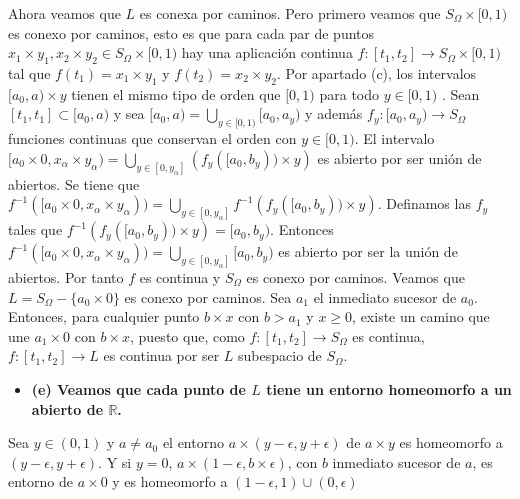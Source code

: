 \documentclass{article}
\begin{document}
Ahora veamos que $L$ es conexa por caminos. Pero primero veamos que $S_\Omega\times [0,1)$ es conexo por caminos, esto es que para cada par de puntos $x_1\times y_1,x_2\times y_2\in S_\Omega\times [0,1)$ hay una aplicación continua $f:[t_1,t_2]\rightarrow S_\Omega\times [0,1)$ tal que $f(t_1)=x_1\times y_1$ y $f(t_2)=x_2\times y_2$.  Por apartado (c), los intervalos $[a_0,a)\times {y}$ tienen el mismo tipo de orden que $[0,1)$ para todo $y\in [0,1)$ . Sean $[t_1,t_1]\subset [a_0,a)$ y sea $[a_0,a)=\bigcup_{y\in [0,1)}[a_0,a_y)$ y además $f_y:[a_0,a_y)\rightarrow S_\Omega$ funciones continuas que conservan el orden con $y\in [0,1)$. El intervalo $[a_0\times 0,x_\alpha\times y_\alpha)=\bigcup_{y\in [0,y_\alpha]}
\left( f_y([a_0,b_y))\times y\right)$ es abierto por ser unión de abiertos. Se tiene que $f^{-1}([a_0\times 0,x_\alpha\times y_\alpha))= \bigcup_{y\in [0,y_\alpha]}
f^{-1}\left( f_y([a_0,b_y))\times y\right)$. Definamos las $f_y$ tales que $f^{-1}\left(f_y([a_0,b_y))\times y\right)= [a_0,b_y)$. Entonces 
$f^{-1}([a_0\times 0,x_\alpha\times y_\alpha))=\bigcup_{y\in [0,y_\alpha]}
[a_0,b_y)$ es abierto por ser la unión de abiertos. Por tanto $f$ es continua y $S_\Omega$ es conexo por caminos. Veamos que $L=S_\Omega-\{a_0\times 0\}$ es conexo por caminos. Sea $a_1$ el inmediato sucesor de $a_0$. Entonces, para cualquier punto $b\times x$ con $b>a_1$ y $x\geq 0$, existe un camino que une $a_1\times 0$ con $b\times x$, puesto que, como $f:[t_1,t_2]\rightarrow S_\Omega$ es continua, $f:[t_1,t_2]\rightarrow L$ es continua por ser $L$ subespacio de $S_\Omega$.
\begin{itemize}
\item \bf (e) \rm Veamos que cada punto de $L$ tiene un entorno homeomorfo a un abierto de $\mathbb{R}$.
\end{itemize}
Sea $y\in (0,1)$ y $a\neq a_0$ el entorno $a\times (y-\epsilon,y+\epsilon)$ de $a\times y$ es homeomorfo a $(y-\epsilon,y+\epsilon)$. Y si $y=0$, $a\times (1-\epsilon,b \times \epsilon)$, con $b$ inmediato sucesor de $a$, es entorno de $a\times 0$ y es homeomorfo a $(1-\epsilon,1)\cup (0,\epsilon)$
\end{document}
